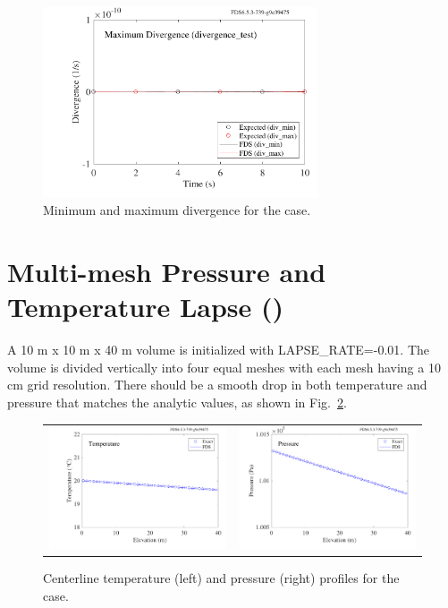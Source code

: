 \documentclass[11pt]{book}
\begin{document}
\begin{figure}[!ht]
\centering
\includegraphics[width=3.2in]{SCRIPT_FIGURES/divergence_test}
\caption[The  case]{Minimum and maximum divergence for the  case.}
\label{divergence_test_fig}
\end{figure}

\section{Multi-mesh Pressure and Temperature Lapse (\texorpdfstring{}{lapse\_rate})}
\label{lapse_rate}

A 10 m x 10 m x 40 m volume is initialized with {\ct LAPSE\_RATE=-0.01}.  The volume is divided vertically into four equal meshes with each mesh having a 10 cm grid resolution.  There should be a smooth drop in both temperature and pressure that matches the analytic values, as shown in Fig.~\ref{lapse_rate_fig}.

\begin{figure}[!ht]
\begin{tabular*}{\textwidth}{lr}
\includegraphics[width=3.2in]{SCRIPT_FIGURES/lapse_rate_T} &
\includegraphics[width=3.2in]{SCRIPT_FIGURES/lapse_rate_P}
\end{tabular*}
\caption[The  test case]{Centerline temperature (left) and pressure (right) profiles for the  case.}
\label{lapse_rate_fig}
\end{figure}
\end{document}
